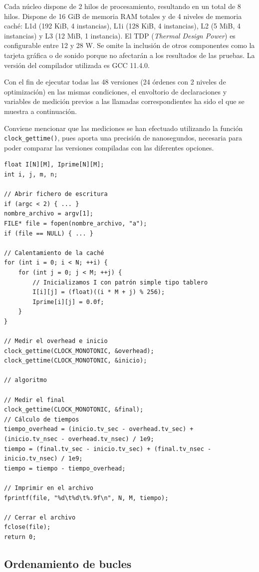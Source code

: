 \documentclass[11pt,a4paper,twoside]{article}
\theoremstyle{definition}
\begin{document}
	Cada núcleo dispone de 2 hilos de procesamiento, resultando en un total de 8 hilos. Dispone de 16 GiB de memoria RAM totales y de 4 niveles de memoria caché: L1d (192 KiB, 4 instancias), L1i (128 KiB, 4 instancias), L2 (5 MiB, 4 instancias) y L3 (12 MiB, 1 instancia). El TDP (\textit{Thermal Design Power}) es configurable entre 12 y 28 W. Se omite la inclusión de otros componentes como la tarjeta gráfica o de sonido porque no afectarán a los resultados de las pruebas. La versión del compilador utilizada es GCC 11.4.0.

	Con el fin de ejecutar todas las 48 versiones (24 órdenes con 2 niveles de optimización) en las mismas condiciones, el envoltorio de declaraciones y variables de medición previos a las llamadas correspondientes ha sido el que se muestra a continuación.
	
	Conviene mencionar que las mediciones se han efectuado utilizando la función \texttt{clock\_gettime()}, pues aporta una precisión de nanosegundos, necesaria para poder comparar las versiones compiladas con las diferentes opciones.
	
	\begin{verbatim}
float I[N][M], Iprime[N][M];
int i, j, m, n;

// Abrir fichero de escritura
if (argc < 2) { ... }
nombre_archivo = argv[1];
FILE* file = fopen(nombre_archivo, "a");
if (file == NULL) { ... }

// Calentamiento de la caché
for (int i = 0; i < N; ++i) {
	for (int j = 0; j < M; ++j) {
		// Inicializamos I con patrón simple tipo tablero
		I[i][j] = (float)((i * M + j) % 256);
		Iprime[i][j] = 0.0f;
	}
}

// Medir el overhead e inicio
clock_gettime(CLOCK_MONOTONIC, &overhead);
clock_gettime(CLOCK_MONOTONIC, &inicio);

// algoritmo

// Medir el final
clock_gettime(CLOCK_MONOTONIC, &final);
// Cálculo de tiempos
tiempo_overhead = (inicio.tv_sec - overhead.tv_sec) + 
(inicio.tv_nsec - overhead.tv_nsec) / 1e9;
tiempo = (final.tv_sec - inicio.tv_sec) + (final.tv_nsec - inicio.tv_nsec) / 1e9;
tiempo = tiempo - tiempo_overhead;

// Imprimir en el archivo
fprintf(file, "%d\t%d\t%.9f\n", N, M, tiempo);

// Cerrar el archivo
fclose(file);
return 0;
	\end{verbatim}

	\subsection{Ordenamiento de bucles}
	
\end{document}
